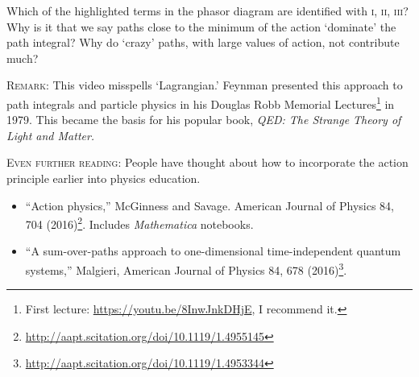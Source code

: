 \documentclass[12pt]{article}
\begin{document}
Which of the highlighted terms in the phasor diagram are identified with \textsc{i, ii, iii}? Why is it that we say paths close to the minimum of the action `dominate' the path integral? Why do `crazy' paths, with large values of action, not contribute much?



\textsc{Remark}: This video misspells `Lagrangian.' Feynman presented this approach to path integrals and particle physics in his  Douglas Robb Memorial Lectures\footnote{First lecture: \url{https://youtu.be/8InwJnkDHjE}, I recommend it.} in 1979. This became the basis for his popular book, \emph{QED: The Strange Theory of Light and Matter.}

\textsc{Even further reading}: People have thought about how to incorporate the action principle earlier into physics education. 
\begin{itemize}
	\item ``Action physics,'' McGinness and Savage. American Journal of Physics 84, 704 (2016)\footnote{\url{http://aapt.scitation.org/doi/10.1119/1.4955145}}. Includes \emph{Mathematica} notebooks.
	\item ``A sum-over-paths approach to one-dimensional time-independent quantum systems,'' Malgieri, American Journal of Physics 84, 678 (2016)\footnote{\url{http://aapt.scitation.org/doi/10.1119/1.4953344}}. 
\end{itemize}

%
%

\end{document}
